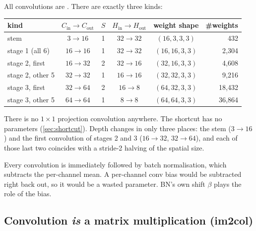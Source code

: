 \begin{repo}
All convolutions are . There are exactly three kinds:
\begin{center}
\begin{tabular}{@{}lccccr@{}}
\toprule
kind & $C_\text{in}\to C_\text{out}$ & $S$ & $H_\text{in}\to H_\text{out}$ & weight shape & \#weights\\
\midrule
stem & $3\to16$ & 1 & $32\to32$ & $(16,3,3,3)$ & 432\\
stage 1 (all 6) & $16\to16$ & 1 & $32\to32$ & $(16,16,3,3)$ & 2{,}304\\
stage 2, first & $16\to32$ & 2 & $32\to16$ & $(32,16,3,3)$ & 4{,}608\\
stage 2, other 5 & $32\to32$ & 1 & $16\to16$ & $(32,32,3,3)$ & 9{,}216\\
stage 3, first & $32\to64$ & 2 & $16\to8$ & $(64,32,3,3)$ & 18{,}432\\
stage 3, other 5 & $64\to64$ & 1 & $8\to8$ & $(64,64,3,3)$ & 36{,}864\\
\bottomrule
\end{tabular}
\end{center}
There is no $1{\times}1$ projection convolution anywhere. The shortcut has no parameters (\cref{sec:shortcut}). Depth changes in only three places: the stem ($3\to16$) and the first convolution of stages 2 and 3 ($16\to32$, $32\to64$), and each of those last two coincides with a stride-2 halving of the spatial size.
\end{repo}

\begin{warn}[why \texttt{bias=False}]
Every convolution is immediately followed by batch normalisation, which subtracts the per-channel mean. A per-channel conv bias would be subtracted right back out, so it would be a wasted parameter. BN's own shift $\beta$ plays the role of the bias.
\end{warn}

\subsection{Convolution \emph{is} a matrix multiplication (im2col)}
\label{sec:im2col}

